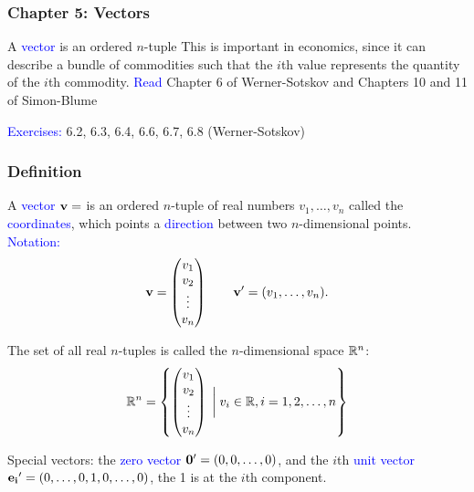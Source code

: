 \documentclass[11pt,aspectratio=169]{beamer}
\begin{document}
\begin{frame}
\frametitle{Chapter 5: Vectors}
\begin{small}
A \textcolor{blue}{vector} is an ordered $n$-tuple
\vskip 12pt
This is important in economics, since it can describe a bundle of commodities such that the $i$th value represents the quantity of the $i$th commodity.
\vskip 12pt
\textcolor{blue}{Read}  Chapter 6 of Werner-Sotskov and Chapters 10 and 11 of Simon-Blume
\vskip 12pt

 \textcolor{blue}{Exercises:} 6.2, 6.3, 6.4, 6.6, 6.7, 6.8 (Werner-Sotskov)




\end{small}
\end{frame}

\begin{frame}
\frametitle{Definition}
\begin{small}
A \textcolor{blue}{vector} $\bf{v}=$ is an ordered $n$-tuple of real numbers $v_1,\dots,v_n$ called the \textcolor{blue}{coordinates}, which points a \textcolor{blue}{direction} between two $n$-dimensional points.
\textcolor{blue}{Notation:}
\begin{equation*}
{\bf v}=\begin{pmatrix}v_1\\
v_2 \\
\vdots\\
v_n
\end{pmatrix} \qquad  {\bf v}'=(v_1,\ldots,v_n).
\end{equation*}

The set of all real $n$-tuples is called the $n$-dimensional space $\mathbb R^n$: 
\begin{equation*}
\mathbb R^n=\left\{\begin{pmatrix}v_1\\
v_2 \\
\vdots\\
v_n
\end{pmatrix}\;  \bigg\vert \; v_i \in \mathbb R, i=1,2,\dots,n \right\}
\end{equation*}

Special vectors: the \textcolor{blue}{zero vector} ${\bf 0}'=(0,0,\dots,0)$, and the $i$th \textcolor{blue}{unit vector} ${\bf e_i}'=(0,\dots,0,1,0,\dots,0)$, the 1 is at the $i$th component.


\end{small}
\end{frame}
\end{document}
